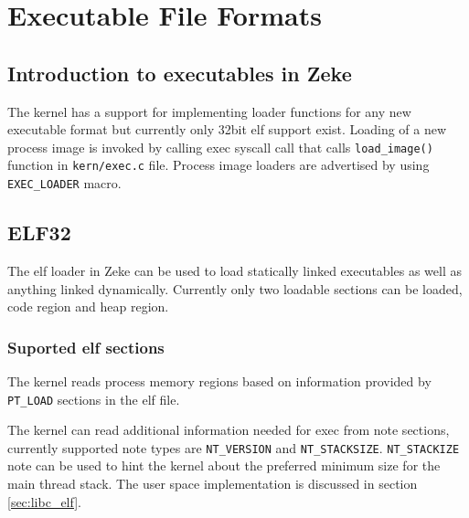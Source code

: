 \chapter{Executable File Formats}
\label{chap:exec}

\section{Introduction to executables in Zeke}

The kernel has a support for implementing loader functions for any new
executable format but currently only 32bit \acf{elf} support exist.
Loading of a new process image is invoked by calling exec syscall call that
calls \verb+load_image()+ function in \verb+kern/exec.c+ file.
Process image loaders are advertised by using \verb+EXEC_LOADER+ macro.

\section{ELF32}

The \acs{elf} loader in Zeke can be used to load statically linked executables
as well as anything linked dynamically. Currently only two loadable sections can
be loaded, code region and heap region.

\subsection{Suported \acs{elf} sections}

The kernel reads process memory regions based on information provided by
\verb+PT_LOAD+ sections in the \acs{elf} file.

The kernel can read additional information needed for exec from note sections,
currently supported note types are \verb+NT_VERSION+ and \verb+NT_STACKSIZE+.
\verb+NT_STACKIZE+ note can be used to hint the kernel about the preferred
minimum size for the main thread stack. The user space implementation is
discussed in section \ref{sec:libc_elf}.
